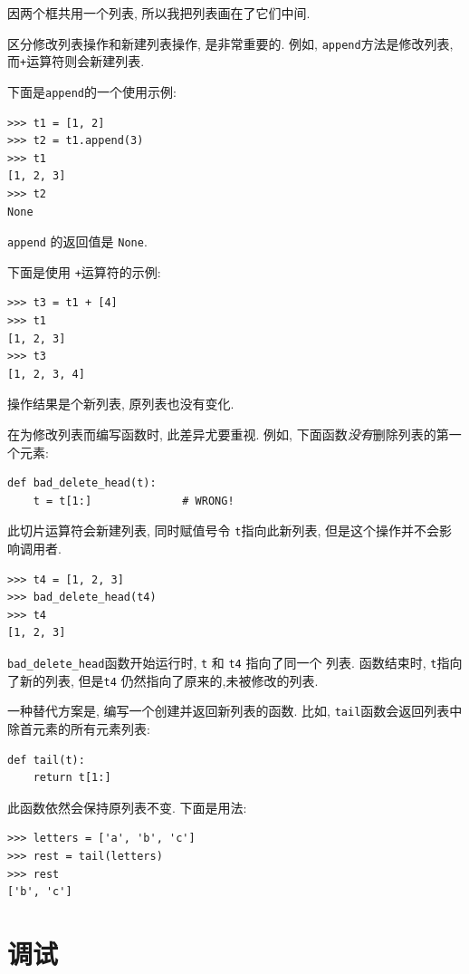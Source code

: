 \documentclass[10pt]{book}
\begin{document}
因两个框共用一个列表, 所以我把列表画在了它们中间. 

区分修改列表操作和新建列表操作, 是非常重要的. 
例如,  {\tt append}方法是修改列表, 而{\tt +}运算符则会新建列表.

下面是{\tt append}的一个使用示例:
%
\begin{verbatim}
>>> t1 = [1, 2]
>>> t2 = t1.append(3)
>>> t1
[1, 2, 3]
>>> t2
None
\end{verbatim}
%
{\tt append} 的返回值是 {\tt None}.

下面是使用 {\tt +}运算符的示例:
%
\begin{verbatim}
>>> t3 = t1 + [4]
>>> t1
[1, 2, 3]
>>> t3
[1, 2, 3, 4]
\end{verbatim}
%
操作结果是个新列表, 原列表也没有变化.

在为修改列表而编写函数时, 此差异尤要重视. 
例如, 下面函数{\em 没有}删除列表的第一个元素:
%
\begin{verbatim}
def bad_delete_head(t):
    t = t[1:]              # WRONG!
\end{verbatim}
%
此切片运算符会新建列表, 同时赋值号令 {\tt t}指向此新列表, 
但是这个操作并不会影响调用者.
%
\begin{verbatim}
>>> t4 = [1, 2, 3]
>>> bad_delete_head(t4)
>>> t4
[1, 2, 3]
\end{verbatim}
%

\verb"bad_delete_head"函数开始运行时, {\tt t} 和 {\tt t4} 指向了同一个
列表. 函数结束时, {\tt t}指向了新的列表, 
但是{\tt t4} 仍然指向了原来的,未被修改的列表.

一种替代方案是, 编写一个创建并返回新列表的函数. 比如, 
{\tt tail}函数会返回列表中除首元素的所有元素列表:

\begin{verbatim}
def tail(t):
    return t[1:]
\end{verbatim}
%
此函数依然会保持原列表不变. 下面是用法:

\begin{verbatim}
>>> letters = ['a', 'b', 'c']
>>> rest = tail(letters)
>>> rest
['b', 'c']
\end{verbatim}



\section{调试}
\end{document}
